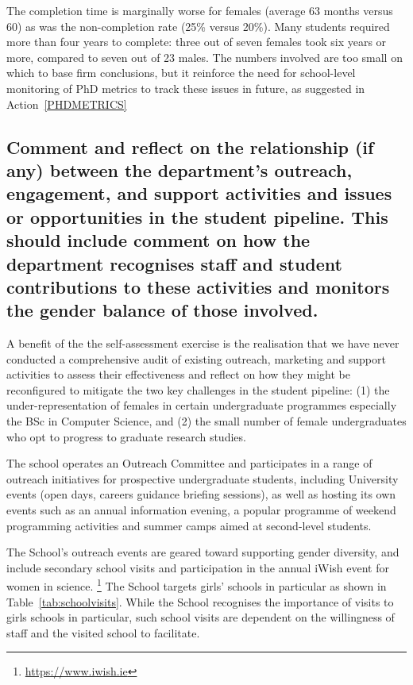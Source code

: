 The completion time is marginally  worse for females (average 63 
months versus 60) as was the non-completion rate (25\% versus 20\%).  
Many students required more than four years to complete: three out 
of seven females took six years or more, compared to seven out of 
23 males. The numbers involved are too small on which to base firm 
conclusions, but it reinforce the need for school-level monitoring 
of PhD metrics to track these issues in future, as suggested in 
Action~\ref{PHDMETRICS}


\subsection{Comment and reflect on the relationship (if any) between the department’s outreach, engagement, and support activities and issues or opportunities in the student pipeline. This should include comment on how the department recognises staff and student contributions to these activities and monitors the gender balance of those involved.}


A benefit of the the self-assessment exercise is the realisation 
that we have never conducted a comprehensive audit of existing 
outreach, marketing and support activities to assess their 
effectiveness and reflect on how they might be reconfigured to 
mitigate the two key challenges in the student pipeline:
(1) the under-representation of females in certain undergraduate
programmes especially the BSc in Computer Science, and 
(2) the  small number of female undergraduates
who opt to progress to graduate research studies.


The school operates an Outreach Committee and participates in  a
range of outreach initiatives for prospective undergraduate 
students, including University events  (open days, careers 
guidance briefing sessions),  as well as hosting its own events 
such as an annual information evening, a popular programme of 
weekend programming activities and summer camps aimed at 
second-level students.

The School's outreach events are geared toward supporting gender 
diversity, and include secondary school visits and participation 
in the annual iWish event for women in science.
\footnote{\url{https://www.iwish.ie}} 
The School targets girls' schools in particular as shown in 
Table~\ref{tab:schoolvisits}. 
While the School recognises the importance of visits to girls schools 
in particular, such school visits are dependent on the willingness 
of staff and the visited school to facilitate. 

